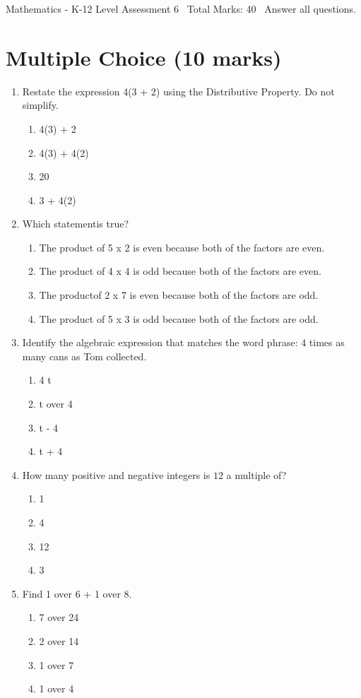 \documentclass[12pt]{article}
\begin{document}
\begin{center}
Mathematics - K-12 Level Assessment 6 \
Total Marks: 40 \
Answer all questions.
\end{center}

\section*{Multiple Choice (10 marks)}
\begin{enumerate}[label=\arabic*.]
\item Restate the expression 4(3 + 2) using the Distributive Property. Do not simplify.
\begin{enumerate}[label=(\alph*)]
    \item 4(3) + 2
    \item 4(3) + 4(2)
    \item 20
    \item 3 + 4(2)
\end{enumerate}
\item Which statementis true?
\begin{enumerate}[label=(\alph*)]
    \item The product of 5 x 2 is even because both of the factors are even.
    \item The product of 4 x 4 is odd because both of the factors are even.
    \item The productof 2 x 7 is even because both of the factors are odd.
    \item The product of 5 x 3 is odd because both of the factors are odd.
\end{enumerate}
\item Identify the algebraic expression that matches the word phrase: 4 times as many cans as Tom collected.
\begin{enumerate}[label=(\alph*)]
    \item 4 t
    \item t over 4
    \item t - 4
    \item t + 4
\end{enumerate}
\item How many positive and negative integers is $12$ a multiple of?
\begin{enumerate}[label=(\alph*)]
    \item 1
    \item 4
    \item 12
    \item 3
\end{enumerate}
\item Find 1 over 6 + 1 over 8.
\begin{enumerate}[label=(\alph*)]
    \item 7 over 24
    \item 2 over 14
    \item 1 over 7
    \item 1 over 4
\end{enumerate}
\end{enumerate}
\end{document}
